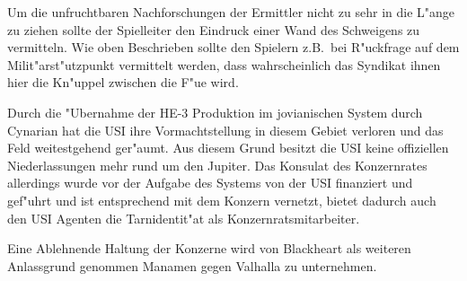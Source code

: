 \begin{remarks}
	Um die unfruchtbaren Nachforschungen der Ermittler nicht zu sehr in die L"ange zu ziehen sollte der Spielleiter den Eindruck einer Wand des Schweigens zu vermitteln. Wie oben Beschrieben sollte den Spielern z.B.~bei R"uckfrage auf dem Milit"arst"utzpunkt vermittelt werden, dass wahrscheinlich das Syndikat ihnen hier die Kn"uppel zwischen die F"u\3e wird.

	Durch die "Ubernahme der HE-3 Produktion im jovianischen System durch Cynarian hat die USI ihre Vormachtstellung in diesem Gebiet verloren und das Feld weitestgehend ger"aumt. Aus diesem Grund besitzt die USI keine offiziellen Niederlassungen mehr rund um den Jupiter. Das Konsulat des Konzernrates allerdings wurde vor der Aufgabe des Systems von der USI finanziert und gef"uhrt und ist entsprechend mit dem Konzern vernetzt, bietet dadurch auch den USI Agenten die Tarnidentit"at als Konzernratsmitarbeiter.

	Eine Ablehnende Haltung der Konzerne wird von Blackheart als weiteren Anlassgrund genommen Ma\3namen gegen Valhalla zu unternehmen.
\end{remarks}

